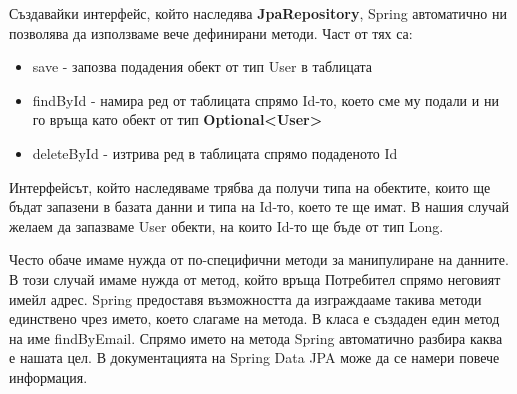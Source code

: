         Създавайки интерфейс, който наследява \textbf{JpaRepository}, Spring автоматично ни позволява да използваме вече дефинирани методи. Част от тях са:
        \begin{itemize}
            \item save - запозва подадения обект от тип User в таблицата
            \item findById - намира ред от таблицата спрямо Id-то, което сме му подали и ни го връща като обект от тип \textbf{Optional<User>}
            \item deleteById - изтрива ред в таблицата спрямо подаденото Id
        \end{itemize}
        
        \begin{figure}[h]
            \centering
            \caption{}
            \label{fig:user_repository}
        \end{figure}
        
        Интерфейсът, който наследяваме трябва да получи типа на обектите, които ще бъдат запазени в базата данни и типа на Id-то, което те ще имат. В нашия случай желаем да запазваме User обекти, на които Id-то ще бъде от тип Long.
        
        Често обаче имаме нужда от по-специфични методи за манипулиране на данните. В този случай имаме нужда от метод, който връща Потребител спрямо неговият имейл адрес. Spring предоставя възможността да изграждааме такива методи единствено чрез името, което слагаме на метода. 
        В класа е създаден един метод на име findByEmail. Спрямо името на метода Spring автоматично разбира каква е нашата цел. В документацията на Spring Data JPA \parencite{Repository} може да се намери повече информация.
        

